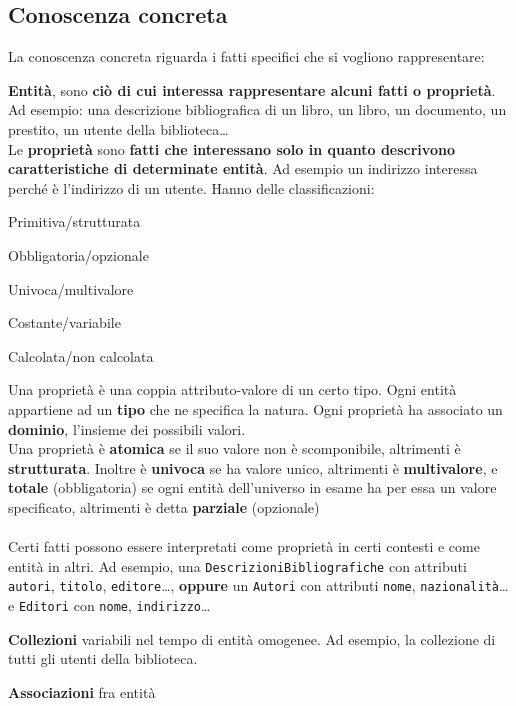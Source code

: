 \documentclass[10pt]{book}
\begin{document}
\subsection{Conoscenza concreta}
La conoscenza concreta riguarda i fatti specifici che si vogliono rappresentare:
\begin{list}{}{}
	\item \textbf{Entità}, sono \textbf{ciò di cui interessa rappresentare alcuni fatti o proprietà}. Ad esempio: una descrizione bibliografica di un libro, un libro, un documento, un prestito, un utente della biblioteca\ldots\\
	Le \textbf{proprietà} sono \textbf{fatti che interessano solo in quanto descrivono caratteristiche di determinate entità}. Ad esempio un indirizzo interessa perché è l'indirizzo di un utente. Hanno delle classificazioni:
	\begin{list}{}{}
		\item Primitiva/strutturata
		\item Obbligatoria/opzionale
		\item Univoca/multivalore
		\item Costante/variabile
		\item Calcolata/non calcolata
	\end{list}
	Una proprietà è una coppia attributo-valore di un certo tipo. Ogni entità appartiene ad un \textbf{tipo} che ne specifica la natura. Ogni proprietà ha associato un \textbf{dominio}, l'insieme dei possibili valori.\\
	Una proprietà è \textbf{atomica} se il suo valore non è scomponibile, altrimenti è \textbf{strutturata}. Inoltre è \textbf{univoca} se ha valore unico, altrimenti è \textbf{multivalore}, e \textbf{totale} (obbligatoria) se ogni entità dell'universo in esame ha per essa un valore specificato, altrimenti è detta \textbf{parziale} (opzionale)\\\\
	Certi fatti possono essere interpretati come proprietà in certi contesti e come entità in altri. Ad esempio, una \texttt{DescrizioniBibliografiche} con attributi \texttt{autori}, \texttt{titolo}, \texttt{editore}\ldots, \textbf{oppure} un \texttt{Autori} con attributi \texttt{nome}, \texttt{nazionalità}\ldots e \texttt{Editori} con \texttt{nome}, \texttt{indirizzo}\ldots
	\item \textbf{Collezioni} variabili nel tempo di entità omogenee. Ad esempio, la collezione di tutti gli utenti della biblioteca.
	\item \textbf{Associazioni} fra entità
\end{list}
\end{document}
